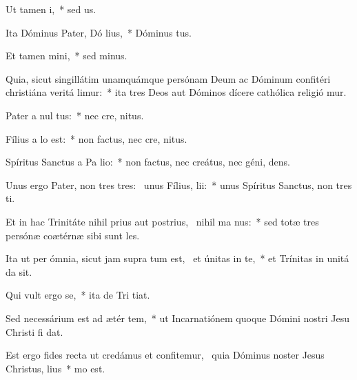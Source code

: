 \item Ut tamen   i,~* sed   us.
\item Ita Dóminus Pater, Dó lius,~* Dóminus  tus.
\item Et tamen   mini,~* sed   minus.
\item Quia, sicut singillátim unamquámque persónam Deum ac Dóminum confitéri christiána veritá limur:~* ita tres Deos aut Dóminos dícere cathólica religió mur.
\item Pater a nul  tus:~* nec cre,  nitus.
\item Fílius a  lo est:~* non factus, nec cre,  nitus.
\item Spíritus Sanctus a Pa  lio:~* non factus, nec creátus, nec géni,  dens.
\item Unus ergo Pater, non tres tres:~\pscross{} unus Fílius,   lii:~* unus Spíritus Sanctus, non tres  ti.
\item Et in hac Trinitáte nihil prius aut postrius,~\pscross{} nihil ma  nus:~* sed totæ tres persónæ coætérnæ sibi sunt  les.
\item Ita ut per ómnia, sicut jam supra tum est,~\pscross{} et únitas in te,~* et Trínitas in unitá da sit.
\item Qui vult ergo  se,~* ita de Tri tiat.
\item Sed necessárium est ad ætér tem,~* ut Incarnatiónem quoque Dómini nostri Jesu Christi fi dat.
\item Est ergo fides recta ut credámus et confitemur,~\pscross{} quia Dóminus noster Jesus Christus,  lius~*   mo est.
